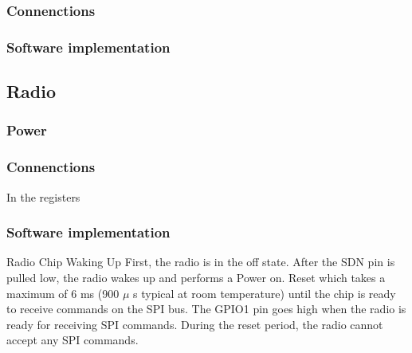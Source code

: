\subsubsection{Connenctions}


\subsubsection{Software implementation}



\newpage
\subsection{Radio}


\subsubsection{Power}


\subsubsection{Connenctions}
 In the registers 

\subsubsection{Software implementation} %
Radio Chip Waking Up First,  the  radio  is  in  the  off  state. After  the  SDN  pin  is  pulled  low,  the  radio  wakes  up  and  performs  a  Power  on.
Reset  which  takes  a  maximum  of  6 ms  (900 $\mu$ s  typical  at  room  temperature)  until  the  chip  is  ready  to  receive commands on the SPI bus. The GPIO1 pin goes high when the radio is ready for receiving SPI commands. During the reset period, the radio cannot accept any SPI commands. 

